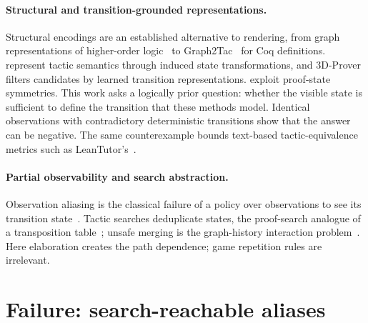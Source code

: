 \documentclass[11pt]{article}
\begin{document}
\paragraph{Structural and transition-grounded representations.}
Structural encodings are an established alternative to rendering, from graph
representations of higher-order
logic~\cite{paliwal2020graph} to Graph2Tac~\cite{blaauwbroek2024graph2tac} for
Coq definitions. \citet{samoylov2025operators} represent tactic semantics
through induced state transformations, and
3D-Prover~\cite{lamont2025threedprover} filters candidates by learned
transition representations. \citet{olejniczak2026symmetries} exploit proof-state
symmetries. This work asks a logically prior question: whether the visible state
is sufficient to define the transition that these methods model. Identical
observations with contradictory deterministic transitions show that the answer
can be negative. The same counterexample bounds text-based tactic-equivalence
metrics such as LeanTutor's~\cite{leantutor2025}.

\paragraph{Partial observability and search abstraction.}
Observation aliasing is the classical failure of a policy over observations to
see its transition state~\cite{whitehead1991learning,singh1994learning,
kaelbling1998planning}. Tactic searches deduplicate states, the proof-search
analogue of a transposition table~\cite{zobrist1970hashing}; unsafe merging is
the graph-history interaction problem~\cite{kishimoto2004graph}. Here
elaboration creates the path dependence; game repetition rules are irrelevant.

\section{Failure: search-reachable aliases}
\label{sec:aliases}
\end{document}
